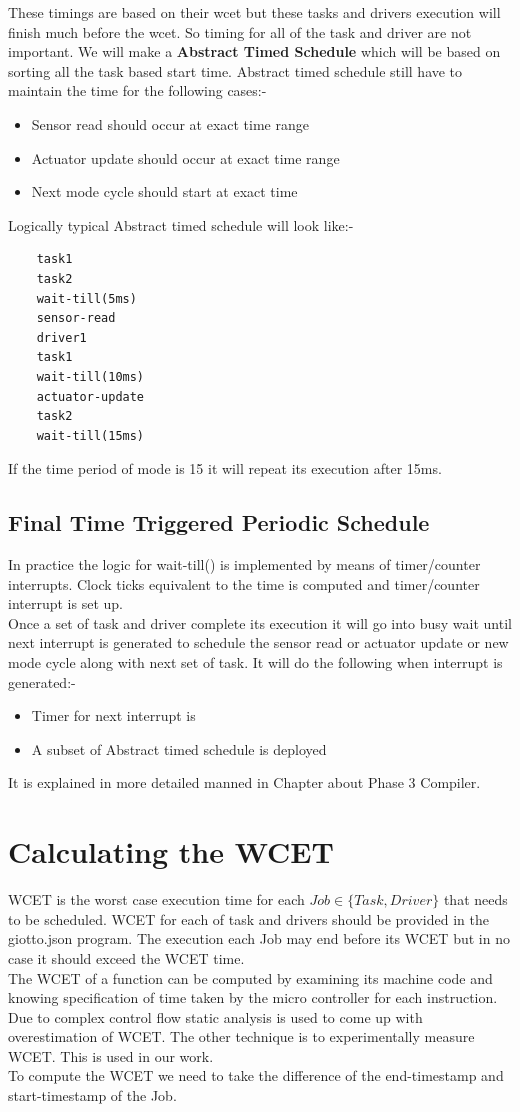 \documentclass[16pt]{report}
\begin{document}
These timings are based on their wcet but these tasks and drivers execution will finish much before the wcet. So timing for all of the task and driver are not important. We will make a \textbf{Abstract Timed Schedule} which will be based on sorting all the task based start time. Abstract timed schedule still have to maintain the time for the following cases:-
\begin{itemize}
    \item Sensor read should occur at exact time range
    \item Actuator update should occur at exact time range
    \item Next mode cycle should start at exact time
\end{itemize}
Logically typical Abstract timed schedule will look like:-
\begin{verbatim}
    task1
    task2
    wait-till(5ms)
    sensor-read
    driver1
    task1
    wait-till(10ms)
    actuator-update
    task2
    wait-till(15ms)
\end{verbatim}
If the time period of mode is 15 it will repeat its execution after 15ms.

\section{Final Time Triggered Periodic Schedule}
In practice the logic for wait-till() is implemented by means of timer/counter interrupts. Clock ticks equivalent to the time is computed and timer/counter interrupt is set up.\\
Once a set of task and driver complete its execution it will go into busy wait until next interrupt is generated to schedule the sensor read or actuator update or new mode cycle along with next set of task.
It will do the following when interrupt is generated:-
\begin{itemize}
    \item Timer for next interrupt is
    \item A subset of Abstract timed schedule is deployed
\end{itemize}
It is explained in more detailed manned in Chapter about Phase 3 Compiler.


\chapter{Calculating the WCET}
WCET is the worst case execution time for each $Job \in \{Task, Driver\}$ that needs to be scheduled. WCET for each of task and drivers should be provided in the giotto.json program. The execution each Job may end before its WCET but in no case it should exceed the WCET time.\\
The WCET of a function can be computed by examining its machine code and knowing specification of time taken by the micro controller for each instruction. Due to complex control flow static analysis is used to come up with overestimation of WCET. The other technique is to experimentally measure WCET. This is used in our work.\\
To compute the WCET we need to take the difference of the end-timestamp and start-timestamp of the Job.
\end{document}
